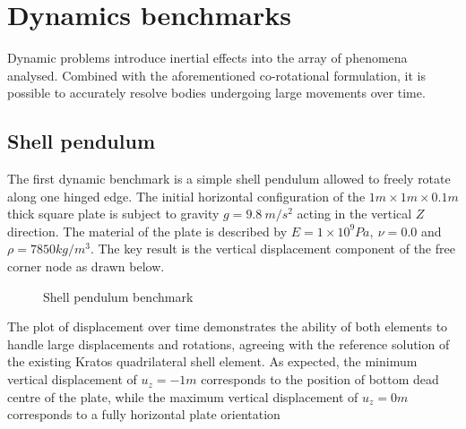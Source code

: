 \section{Dynamics benchmarks}

Dynamic problems introduce inertial effects into the array of phenomena analysed. Combined with the aforementioned co-rotational formulation, it is possible to accurately resolve bodies undergoing large movements over time.

\subsection{Shell pendulum}

The first dynamic benchmark is a simple shell pendulum allowed to freely rotate along one hinged edge. The initial horizontal configuration of the $1m\times1m\times0.1m$ thick square plate is subject to gravity $g = 9.8\ m/s^2$ acting in the vertical $Z$ direction. The material of the plate is described by $E = 1\times 10^9 Pa,\ \nu = 0.0$ and $\rho = 7850 kg/m^3$. The key result is the vertical displacement component of the free corner node as drawn below.
 
\begin{figure}[H]
	\caption{\label{ref_label_overall}Shell pendulum benchmark}
\end{figure}

The plot of displacement over time demonstrates the ability of both elements to handle large displacements and rotations, agreeing with the reference solution of the existing Kratos quadrilateral shell element. As expected, the minimum vertical displacement of $u_z=-1m$ corresponds to the position of bottom dead centre of the plate, while the maximum vertical displacement of $u_z=0m$ corresponds to a fully horizontal plate orientation


